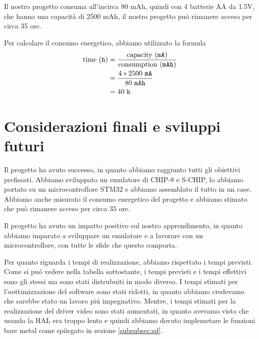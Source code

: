 \documentclass[a4paper]{article}
\begin{document}
Il nostro progetto consuma all'incirca 80 mAh, quindi con 4 batterie AA da 1.5V, che hanno una capacità di 2500 mAh, il nostro progetto può rimanere acceso per circa 35 ore.

Per calcolare il consumo energetico, abbiamo utilizzato la formula
\begin{equation*}
    \begin{aligned}
        \textmd{time} \ (\texttt{h}) & = \frac{\textmd{capacity} \ (\texttt{mA})}{\textmd{consumption} \ (\texttt{mAh})}\\
                                     & = \frac{4 * 2500 \ \texttt{mA}}{80 \ \texttt{mAh}}\\
                                     & = 40 \ \texttt{h}
    \end{aligned}
\end{equation*}

\section{Considerazioni finali e sviluppi futuri}

Il progetto ha avuto successo, in quanto abbiamo raggiunto tutti gli obiettivi prefissati. Abbiamo sviluppato un emulatore di CHIP-8 e S-CHIP, lo abbiamo portato su un microcontrollore STM32 e abbiamo assemblato il tutto in un case. Abbiamo anche misurato il consumo energetico del progetto e abbiamo stimato che può rimanere acceso per circa 35 ore.

Il progetto ha avuto un impatto positivo sul nostro apprendimento, in quanto abbiamo imparato a sviluppare un emulatore e a lavorare con un microcontrollore, con tutte le sfide che questo comporta.

Per quanto riguarda i tempi di realizzazione, abbiamo rispettato i tempi previsti. Come si pu\'o vedere nella tabella sottostante, i tempi previsti e i tempi effettivi sono gli stessi ma sono stati distrubuiti in modo diverso.
I tempi stimati per l'oottimizzazione del software sono stati ridotti, in quanto abbiamo credevamo che sarebbe stato un lavoro pi\'u impegnativo. Mentre, i tempi stimati per la realizzazione del driver video sono stati aumentati, in quanto avevamo visto che usando la HAL era troppo lento e quindi abbiamo dovuto implemetare le funzioni bare metal come spiiegato in sezione \ref{subsubsec:sd}.
\end{document}
